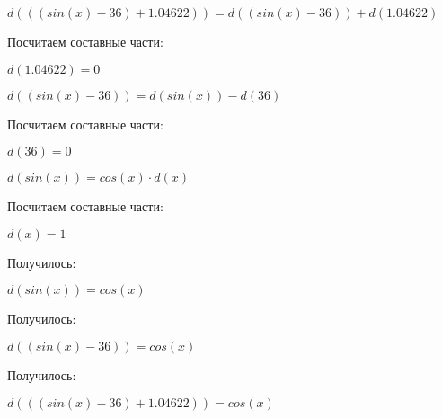 $ d(((sin(x)-36)+1.04622)) = d((sin(x)-36)) + d(1.04622)$

Посчитаем составные части:

$ d(1.04622) = 0$

$ d((sin(x)-36)) = d(sin(x)) - d(36)$

Посчитаем составные части:

$ d(36) = 0$

$ d(sin(x)) = cos(x) \cdot d(x)$

Посчитаем составные части:

$ d(x) = 1$

Получилось:

$ d(sin(x)) = cos(x)$

Получилось:

$ d((sin(x)-36)) = cos(x)$

Получилось:

$ d(((sin(x)-36)+1.04622)) = cos(x)$

